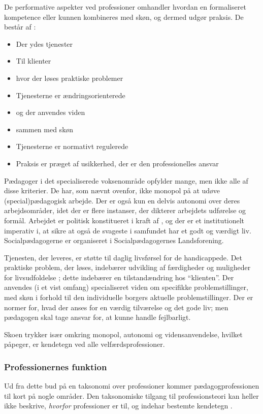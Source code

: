 De performative aspekter ved professioner omhandler hvordan en formaliseret kompetence eller kunnen kombineres med skøn, og dermed udgør praksis. De består af \autocite[s 19ff]{molanderProfesjonsstudierIntroduksjon2008}:
\begin{itemize}
  \item
    Der ydes tjenester
  \item
    Til klienter
  \item
    hvor der løses praktiske problemer
  \item
    Tjenesterne er ændringsorienterede
  \item
    og der anvendes viden
  \item
    sammen med skøn
  \item
    Tjenesterne er normativt regulerede
  \item
    Praksis er præget af usikkerhed, der er den professionelles ansvar
\end{itemize}

Pædagoger i det specialiserede voksenområde opfylder mange, men ikke alle af disse kriterier.
De har, som nævnt ovenfor, ikke monopol på at udøve (special)pædagogisk arbejde.
Der er også kun en delvis autonomi over deres arbejdsområder, idet der er flere instanser, der dikterer arbejdets udførelse og formål.
Arbejdet er politisk konstitueret i kraft af \autocite{social-ogindenrigsministerietBekendtgorelseAfLov2019}, og der er et institutionelt imperativ i, at sikre at også de svageste i samfundet har et godt og værdigt liv.
Socialpædagogerne er organiseret i Socialpædagogernes Landsforening.

Tjenesten, der leveres, er støtte til daglig livsførsel for de handicappede.
Det praktiske problem, der løses, indebærer udvikling af færdigheder og muligheder for livsudfoldelse \autocite[§ 81ff]{social-ogindenrigsministerietBekendtgorelseAfLov2019}; dette indebærer en tilstandændring hos “klienten”.
Der anvendes (i et vist omfang) specialiseret viden om specifikke problemstillinger, med skøn i forhold til den individuelle borgers aktuelle problemstillinger.
Der er normer for, hvad der anses for en værdig tilværelse og det gode liv; men pædagogen skal tage ansvar for, at kunne handle fejlbarligt.

Skoen trykker især omkring monopol, autonomi og vidensanvendelse, hvilket \citeauthor{frederiksenVelfaerdsprofessionerMellemOmsorg2017} påpeger, er kendetegn ved alle velfærdsprofessioner.

\subsubsection{Professionernes funktion}
Ud fra dette bud på en taksonomi over professioner kommer pædagogprofessionen til kort på nogle områder.
Den taksonomiske tilgang til professionsteori kan heller ikke beskrive, \textit{hvorfor} professioner er til, og indehar bestemte kendetegn \autocite[s. 450]{frederiksenVelfaerdsprofessionerMellemOmsorg2017}.

